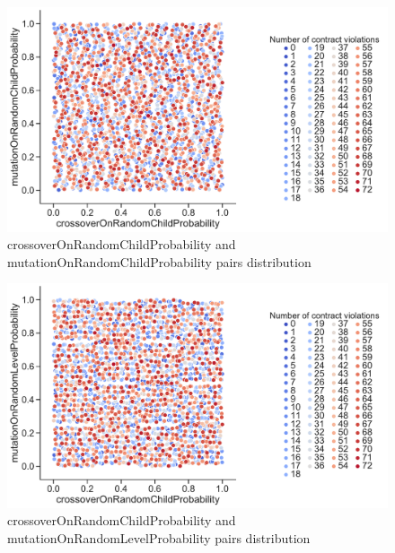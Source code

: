 \begin{figure}
	\centering
	\includegraphics[width=\textwidth]{images/PairsDistr/crossoverOnRandomChildProbability_mutationOnRandomChildProbability.pdf}
	\caption[crossoverOnRandomChildProbability and mutationOnRandomChildProbability pairs distribution]{crossoverOnRandomChildProbability and mutationOnRandomChildProbability pairs distribution}
	\label{fig:crossoverOnRandomChildProbability_mutationOnRandomChildProbability_pair}
\end{figure}
\begin{figure}
	\centering
	\includegraphics[width=\textwidth]{images/PairsDistr/crossoverOnRandomChildProbability_mutationOnRandomLevelProbability.pdf}
	\caption[crossoverOnRandomChildProbability and mutationOnRandomLevelProbability pairs distribution]{crossoverOnRandomChildProbability and mutationOnRandomLevelProbability pairs distribution}
	\label{fig:crossoverOnRandomChildProbability_mutationOnRandomLevelProbability_pair}
\end{figure}
